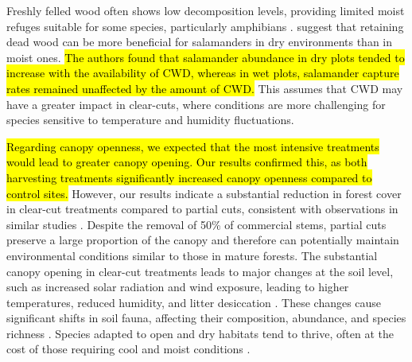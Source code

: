 Freshly felled wood often shows low decomposition levels, providing limited moist refuges suitable for some species, particularly amphibians \citep{Petranka1994Effectstimber,Morneault2004effectshelterwood,Owens2008Amphibianreptile,Otto2013Amphibianresponse}. 
\cite{Petranka1994Effectstimber} suggest that retaining dead wood can be more beneficial for salamanders in dry environments than in moist ones. 
\hl{The authors found that salamander abundance in dry plots tended to increase with the availability of CWD, whereas in wet plots, salamander capture rates remained unaffected by the amount of CWD.}
This assumes that CWD may have a greater impact in clear-cuts, where conditions are more challenging for species sensitive to temperature and humidity fluctuations.
 
\hl{Regarding canopy openness, we expected that the most intensive treatments would lead to greater canopy opening.  
Our results confirmed this, as both harvesting treatments significantly increased canopy openness compared to control sites.}
However, our results indicate a substantial reduction in forest cover in clear-cut treatments compared to partial cuts, consistent with observations in similar studies \citep{Nolet2018Comparingeffects,Mazerolle2021Woodlandsalamander}. 
Despite the removal of 50\% of commercial stems, partial cuts preserve a large proportion of the canopy and therefore can potentially maintain environmental conditions similar to those in mature forests. 
The substantial canopy opening in clear-cut treatments leads to major changes at the soil level, such as increased solar radiation and wind exposure, leading to higher temperatures, reduced humidity, and litter desiccation \citep{Keenan1993ecologicaleffects,Chen1999MicroclimateForest,Lindo2003Microbialbiomass,Brooks2008Forestfloor}. 
These changes cause significant shifts in soil fauna, affecting their composition, abundance, and species richness \citep{Staab2023Insectdecline}. 
Species adapted to open and dry habitats tend to thrive, often at the cost of those requiring cool and moist conditions \citep{Niemela2007effectsforestry,Ochs2022Responseterrestrial,Staab2023Insectdecline}.

